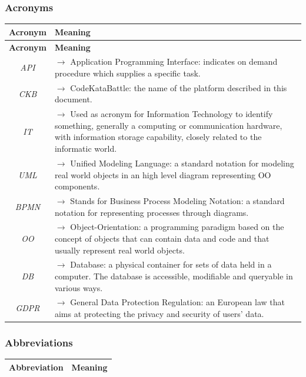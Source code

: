 \documentclass{article}
\begin{document}
{\subsubsection{Acronyms}
\begin{xltabular}{\textwidth}{ >{\raggedright\arraybackslash}c >{\raggedright\arraybackslash}X }
    \hline
    \textbf{Acronym} & \textbf{Meaning} \\
    \hline

    \endfirsthead

    \hline
    \textbf{Acronym} & \textbf{Meaning} \\
    \hline

    \endhead
    \endfoot
    \endlastfoot

    \textit{API} & $\rightarrow$ Application Programming Interface: indicates on demand procedure which supplies a specific task.
    \\
    \textit{CKB} & $\rightarrow$ CodeKataBattle: the name of the platform described in this document.
    \\
    \textit{IT} & $\rightarrow$ Used as acronym for Information Technology to identify something, 
    generally a computing or communication hardware, with information storage capability, closely related to the informatic world.
    \\
    \textit{UML} & $\rightarrow$ Unified Modeling Language: a standard notation for modeling real world objects in an high level diagram
     representing OO components.
    \\
    \textit{BPMN} & $\rightarrow$ Stands for Business Process Modeling Notation: a standard notation for representing processes through diagrams.
    \\
    \textit{OO} & $\rightarrow$ Object-Orientation: a programming paradigm based on the concept of objects that can contain data and code
     and that usually represent real world objects.
    \\
    \textit{DB} & $\rightarrow$ Database: a physical container for sets of data held in a computer. 
    The database is accessible, modifiable and queryable in various ways.
    \\
    \textit{GDPR} & $\rightarrow$ General Data Protection Regulation: an European law that aims at protecting the privacy and security of users' data.
\end{xltabular}


\subsubsection{Abbreviations}
\begin{xltabular}{\textwidth}{ >{\raggedright\arraybackslash}c >{\raggedright\arraybackslash}X }
    \hline
    \textbf{Abbreviation} & \textbf{Meaning} \\
    \hline


\end{xltabular}}
\end{document}
